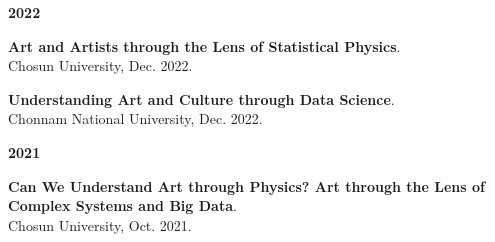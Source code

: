 \documentclass[10pt]{article}
\newenvironment{innerlist}[1][\enskip\textbullet]%
{\vspace{0.2\baselineskip}\begin{compactitem}[#1]}{\end{compactitem}\vspace{0.2\baselineskip}}
\begin{document}
\textbf{2022}
\begin{innerlist}
\item \textbf{Art and Artists through the Lens of Statistical Physics}.\\
Chosun University, Dec. 2022.
\item \textbf{Understanding Art and Culture through Data Science}.\\
Chonnam National University, Dec. 2022.
\end{innerlist}

\textbf{2021}
\begin{innerlist}

\item \textbf{Can We Understand Art through Physics? Art through the Lens of Complex Systems and Big Data}.\\
Chosun University, Oct. 2021.

\end{innerlist}
\end{document}
